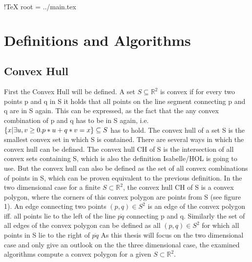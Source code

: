!TeX root = ../main.tex

\chapter{Definitions and Algorithms}\label{chapter:definitions_algorithms}

\section{Convex Hull}
\label{sec:conv_hull}
First the Convex Hull will be defined. A set $ S \subseteq \mathbb{R}^2 $ is convex if for  every
two points p and q in S it holds that all points on the line segment connecting p and q 
are in S again. This can be expressed, as the fact that the any convex combination of 
p and q has to be in S again, i.e. $ \{  x | \exists u , v \geq 0 . \space p * u + q * v = x \} \subseteq S$
has to hold. The convex hull of a set S is the smallest convex set in which S is contained. 
There are several ways in which the convex hull can be defined.
The convex hull CH of S is the intersection of all convex sets containing S, which 
is also the definition Isabelle/HOL is going to use. But the convex hull can also be defined 
as the set of all convex combinations of points in S, which can be proven equivalent to the previous definition.   
In the two dimensional case for a finite $S \subset \mathbb{R}^2$, the convex hull CH of S 
is a convex polygon, where the corners of this convex polygon are points from S (see figure 1). \cite{de2000computational}
An edge connecting two points $(p,q) \in S^2$  is an edge of the convex polygon iff. all points 
lie to the left of the line $\overline{pq}$ connecting p and q. Similarly the set of all 
edges of the convex polygon can be defined as all $(p,q) \in S^2$ for which
all points in S lie to the right of $\overline{pq}$  
As this thesis will focus on the two dimensional case and only give an outlook on the the 
three dimensional case, the examined algorithms compute a convex polygon for a given $S \subset \mathbb{R}^2$. 


